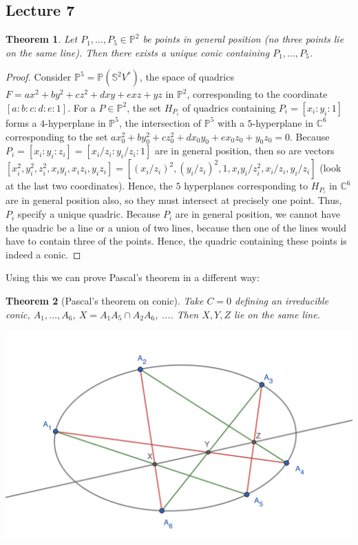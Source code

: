 \documentclass[12pt]{article}
\newcommand{\C}{\mathbb{C}}
\renewcommand{\P}{\mathbb{P}}
\renewcommand{\S}{\mathbb{S}}
\newtheorem{theorem}{Theorem}[section]
\begin{document}
    \subsection{Lecture 7}
    \begin{theorem}
        Let $P_1, \dots, P_5 \in \P^2$ be points in general position (no three points lie on the same line). Then there exists a unique conic containing $P_1, \dots, P_5$. 
    \end{theorem}
    \begin{proof}
        Consider $\P^5 = \P(\S^2V^*)$, the space of quadrics $F = ax^2 + by^2 + cz^2 + dxy + exz + yz$ in $\P^2$, corresponding to the coordinate $[a:b:c:d:e:1]$. For a $P \in \P^2$, the set $H_{P_i}$ of quadrics containing $P_i = [x_i:y_i:1]$ forms a $4$-hyperplane in $\P^5$, the intersection of $\P^5$ with a $5$-hyperplane in $\C^6$ corresponding to the set $ax_0^2 + by_0^2 + cz_0^2 + dx_0y_0 + ex_0z_0 + y_0z_0 = 0$. Because $P_i = [x_i: y_i: z_i] = [x_i/z_i: y_i/z_i: 1]$ are in general position, then so are vectors $[x_i^2, y_i^2, z_i^2, x_iy_i, x_iz_i, y_iz_i] = [(x_i/z_i)^2, (y_i/z_i)^2, 1, x_iy_i/z_i^2, x_i/z_i, y_i/z_i]$ (look at the last two coordinates). Hence, the $5$ hyperplanes corresponding to $H_{P_i}$ in $\C^6$ are in general position also, so they must intersect at precisely one point. Thus, $P_i$ specify a unique quadric. Because $P_i$ are in general position, we cannot have the quadric be a line or a union of two lines, because then one of the lines would have to contain three of the points. Hence, the quadric containing these points is indeed a conic. 
    \end{proof}
    Using this we can prove Pascal's theorem in a different way:
    \begin{theorem}
        [Pascal's theorem on conic] Take $C = 0$ defining an irreducible conic, $A_1, \dots, A_6$, $X = A_1A_5 \cap A_2A_6$, .... Then $X, Y, Z$ lie on the same line. 
        \begin{center}
            \includegraphics[width = 0.7\linewidth]{pascal_pf.png}
        \end{center}
    \end{theorem}
\end{document}

